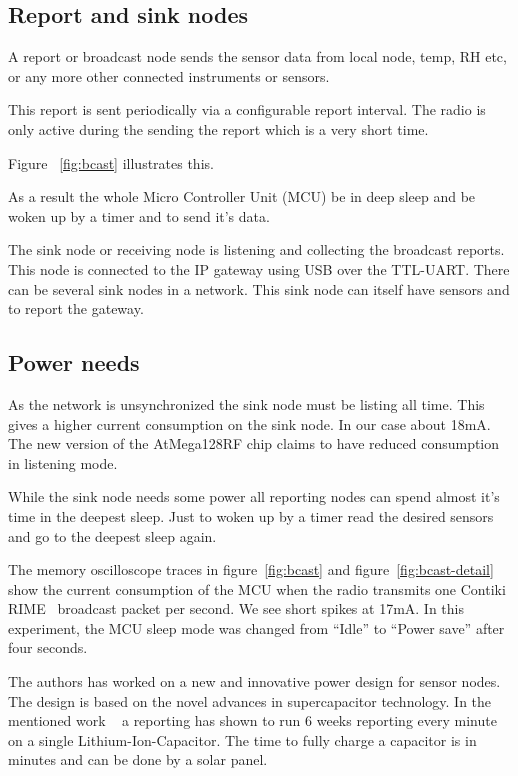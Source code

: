 \documentclass[conference, a4paper,10pt,twocolumn]{IEEEtran}
\begin{document}
\subsection{Report and sink nodes}

A report or broadcast node sends the sensor data from local 
node, temp, RH etc, or any more other connected instruments 
or sensors.

This report is sent periodically via a configurable report
interval. The radio is only active during the sending the 
report which is a very short time.

Figure ~\ref{fig:bcast} illustrates this.

As a result the whole Micro Controller Unit (MCU) be in deep 
sleep and be woken up by a timer and to send it's data.

The sink node or receiving node is listening and collecting
the broadcast reports. This node is connected to the IP gateway
using USB over the TTL-UART.  There can be several sink nodes
in a network. This sink node can itself have sensors and to
report the gateway.

\subsection{Power needs}

As the network is unsynchronized the sink node must be listing
all time. This gives a higher current consumption on the sink node. 
In our case about 18mA. The new version of the AtMega128RF chip 
claims to have reduced consumption in listening mode. ~\cite{ATMEGA}

While the sink node needs some power all reporting nodes 
can spend almost it's time in the deepest sleep. Just to woken 
up by a timer read the desired sensors and go to the deepest 
sleep again. 

The memory oscilloscope traces in figure~\ref{fig:bcast} 
and figure~\ref{fig:bcast-detail} show the current consumption 
of the MCU when the radio transmits one Contiki RIME~\cite{RIME} 
broadcast packet per second. 
We see short spikes at 17mA. In this experiment, the MCU sleep 
mode was changed from ``Idle'' to ``Power save'' after four seconds.

The authors has worked on a new and innovative power design 
for sensor nodes. The design is based on the novel advances 
in supercapacitor technology. In the mentioned work ~\cite{LICCAP}  
a reporting has shown to run 6 weeks reporting every minute
on a single Lithium-Ion-Capacitor. The time to fully charge 
a capacitor is in minutes and can be done by a solar panel.
\end{document}
